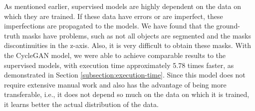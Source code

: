 As mentioned earlier, supervised models are highly dependent on the data on which they are trained. If these data have errors or are imperfect, these imperfections are propagated to the models. We have found that the ground-truth masks have problems, such as not all objects are segmented and the masks discontinuities in the z-axis. Also, it is very difficult to obtain these masks. With the CycleGAN model, we were able to achieve comparable results to the supervised models, with execution time approximately 5.78 times faster, as demonstrated in Section \ref{subsection:execution-time}. Since this model does not require extensive manual work and also has the advantage of being more transferable, i.e., it does not depend so much on the data on which it is trained, it learns better the actual distribution of the data.